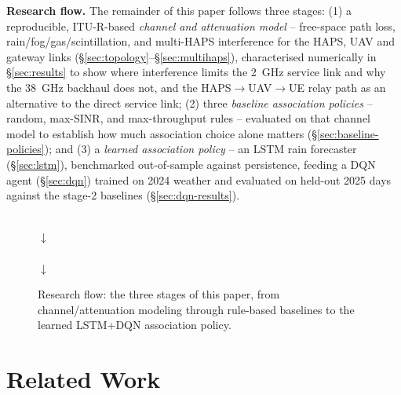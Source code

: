 \documentclass[]{ieeeaccess}
\begin{document}
\textbf{Research flow.} The remainder of this paper follows three stages: (1) a reproducible, ITU-R-based \emph{channel and attenuation model} -- free-space path loss, rain/fog/gas/scintillation, and multi-HAPS interference for the HAPS, UAV and gateway links (\S\ref{sec:topology}--\S\ref{sec:multihaps}), characterised numerically in \S\ref{sec:results} to show where interference limits the 2~GHz service link and why the 38~GHz backhaul does not, and the HAPS$\to$UAV$\to$UE relay path as an alternative to the direct service link; (2) three \emph{baseline association policies} -- random, max-SINR, and max-throughput rules -- evaluated on that channel model to establish how much association choice alone matters (\S\ref{sec:baseline-policies}); and (3) a \emph{learned association policy} -- an LSTM rain forecaster (\S\ref{sec:lstm}), benchmarked out-of-sample against persistence, feeding a DQN agent (\S\ref{sec:dqn}) trained on 2024 weather and evaluated on held-out 2025 days against the stage-2 baselines (\S\ref{sec:dqn-results}).

\begin{figure}[H]
\centering
\footnotesize
{}\\[1mm]
$\downarrow$\\[1mm]
\\[1mm]
$\downarrow$\\[1mm]
\caption{Research flow: the three stages of this paper, from channel/attenuation modeling through rule-based baselines to the learned LSTM+DQN association policy.}
\label{fig:research-flow}
\end{figure}
\FloatBarrier

\section{Related Work}
\label{sec:related-work}
\end{document}
